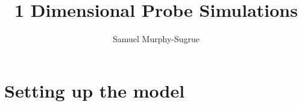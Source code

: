 \documentclass[12pt]{article}
\begin{document}
\title{1 Dimensional Probe Simulations}
\author{Samuel Murphy-Sugrue\\}

\maketitle
\clearpage
\tableofcontents
\clearpage


\section{Setting up the model}
\end{document}
